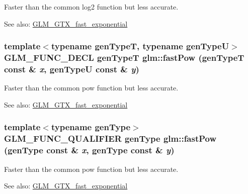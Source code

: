 Faster than the common log2 function but less accurate. \begin{Desc}
\item[See also:]\hyperlink{group__gtx__fast__exponential}{GLM\_\-GTX\_\-fast\_\-exponential} \end{Desc}
\hypertarget{group__gtx__fast__exponential_g1cbcbe8fc0fd21f221cfc10104a3a773}{
\subsubsection[fastPow]{\setlength{\rightskip}{0pt plus 5cm}template$<$typename genTypeT, typename genTypeU$>$ GLM\_\-FUNC\_\-DECL genTypeT glm::fastPow (genTypeT const \& {\em x}, \/  genTypeU const \& {\em y})}}
\label{group__gtx__fast__exponential_g1cbcbe8fc0fd21f221cfc10104a3a773}


Faster than the common pow function but less accurate. \begin{Desc}
\item[See also:]\hyperlink{group__gtx__fast__exponential}{GLM\_\-GTX\_\-fast\_\-exponential} \end{Desc}
\hypertarget{group__gtx__fast__exponential_g399b134d7015729817135440eb047d5a}{
\subsubsection[fastPow]{\setlength{\rightskip}{0pt plus 5cm}template$<$typename genType$>$ GLM\_\-FUNC\_\-QUALIFIER genType glm::fastPow (genType const \& {\em x}, \/  genType const \& {\em y})}}
\label{group__gtx__fast__exponential_g399b134d7015729817135440eb047d5a}


Faster than the common pow function but less accurate. \begin{Desc}
\item[See also:]\hyperlink{group__gtx__fast__exponential}{GLM\_\-GTX\_\-fast\_\-exponential} \end{Desc}
